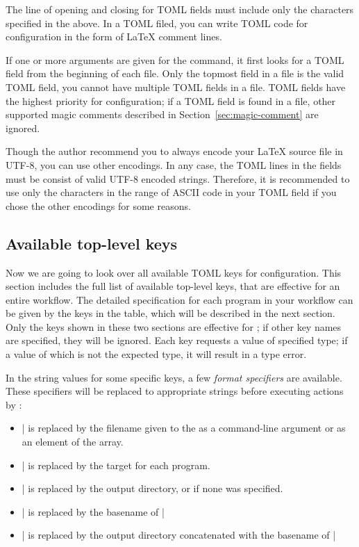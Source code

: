\documentclass{llmk-doc}
\begin{document}
The line of opening and closing for TOML fields must include only the
characters specified in the above. In a TOML filed, you can write TOML code for
 configuration in the form of {\LaTeX} comment lines.
%
\begin{htcode}
\end{htcode}

If one or more arguments are given for the  command, it first looks
for a TOML field from the beginning of each file. Only the topmost field in a
file is the valid TOML field, \ie you cannot have multiple TOML fields in a
file. TOML fields have the highest priority for  configuration; if a
TOML field is found in a file, other supported magic comments described in
Section~\ref{sec:magic-comment} are ignored.

Though the author recommend you to always encode your {\LaTeX} source file in
UTF-8, you can use other encodings. In any case, the TOML lines in the fields
must be consist of valid UTF-8 encoded strings. Therefore, it is recommended to
use only the characters in the range of ASCII code in your TOML field if you
chose the other encodings for some reasons.

\subsection{Available top-level keys}
\label{sec:top-level-keys}

Now we are going to look over all available TOML keys for 
configuration. This section includes the full list of available top-level keys,
that are effective for an entire workflow. The detailed specification for each
program in your workflow can be given by the keys in the  table,
which will be described in the next section. Only the keys shown in these two
sections are effective for ; if other key names are specified, they
will be ignored. Each key requests a value of specified type; if a value of
which is not the expected type, it will result in a type error.

In the string values for some specific keys, a few \emph{format specifiers} are
available. These specifiers will be replaced to appropriate strings before
executing actions by :
%
\begin{itemize}
\item |%
  is replaced by the filename given to the  as a command-line
  argument or as an element of the  array.
\item |%
  is replaced by the target for each program.
\item |%
  is replaced by the output directory, or  if none was specified.
\item |%
  is replaced by the basename of |%
\item |%
  is replaced by the output directory concatenated with the basename of |%
\end{itemize}
\end{document}
